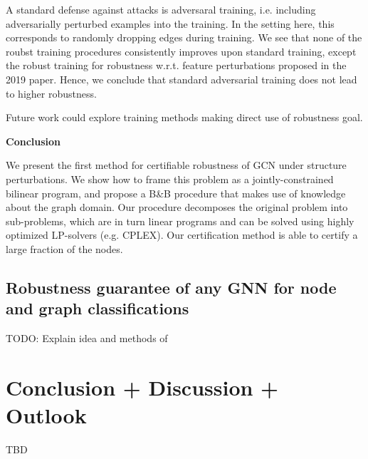 \documentclass[a4paper,preprint]{sig-alternate}
\begin{document}
A standard defense against attacks is adversaral training, i.e. including adversarially perturbed examples into the training.
In the setting here, this corresponds to randomly dropping edges during training. We see that none of the roubst training procedures
consistently improves upon standard training, except the robust training for robustness w.r.t. feature perturbations proposed in the 2019 paper.
Hence, we conclude that standard adversarial training does not lead to higher robustness.\newline

Future work could explore training methods making direct use of robustness goal.\newline

\textbf{Conclusion}\newline

We present the first method for certifiable robustness of GCN under structure perturbations. We show how to frame this problem as a jointly-constrained
bilinear program, and propose a B\&B procedure that makes use of knowledge about the graph domain. Our procedure decomposes the original problem into
sub-problems, which are in turn linear programs and can be solved using highly optimized LP-solvers (e.g. CPLEX). Our certification method is able to certify
a large fraction of the nodes.


\vfill
\pagebreak

\subsection{Robustness guarantee of any GNN for node and graph classifications}
\label{sec:paper_four}

TODO: Explain idea and methods of \cite{wang2020certified}

\section{Conclusion + Discussion + Outlook}
\label{sec:conclusion}
TBD

\vfill
\pagebreak



\end{document}

